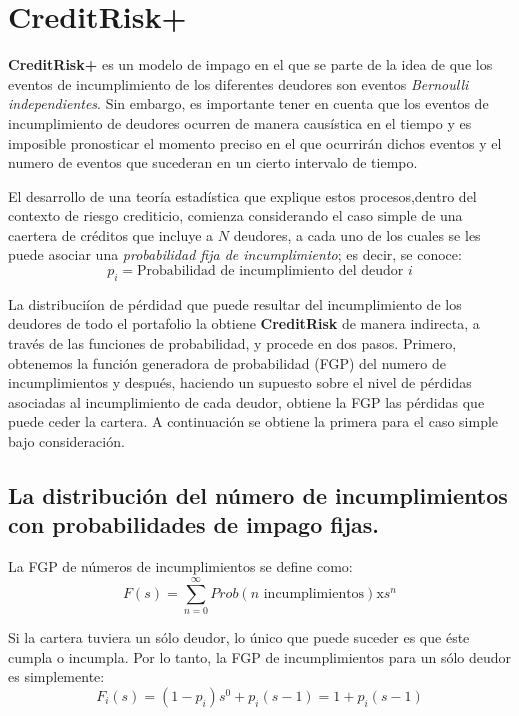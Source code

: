 \documentclass[
  12pt,
]{krantz}
\theoremstyle{definition}
\theoremstyle{definition}
\theoremstyle{definition}
\theoremstyle{remark}
\begin{document}
\mainmatter

\hypertarget{creditrisk}{%
\chapter{CreditRisk+}\label{creditrisk}}

\textbf{CreditRisk+} es un modelo de impago en el que se parte de la idea de que los eventos de incumplimiento de los diferentes deudores son eventos \emph{Bernoulli independientes}. Sin embargo, es importante tener en cuenta que los eventos de incumplimiento de deudores ocurren de manera causística en el tiempo y es imposible pronosticar el momento preciso en el que ocurrirán dichos eventos y el numero de eventos que sucederan en un cierto intervalo de tiempo.

El desarrollo de una teoría estadística que explique estos procesos,dentro del contexto de riesgo crediticio, comienza considerando el caso simple de una caertera de créditos que incluye a \(N\) deudores, a cada uno de los cuales se les puede asociar una \emph{probabilidad fija de incumplimiento}; es decir, se conoce: \[p_i=\textrm{Probabilidad de incumplimiento del deudor } i\]

La distribuciíon de pérdidad que puede resultar del incumplimiento de los deudores de todo el portafolio la obtiene \textbf{CreditRisk} de manera indirecta, a través de las funciones de probabilidad, y procede en dos pasos. Primero, obtenemos la función generadora de probabilidad (FGP) del numero de incumplimientos y después, haciendo un supuesto sobre el nivel de pérdidas asociadas al incumplimiento de cada deudor, obtiene la FGP las pérdidas que puede ceder la cartera. A continuación se obtiene la primera para el caso simple bajo consideración.

\hypertarget{la-distribucion-del-numero-de-incumplimientos-con-probabilidades-de-impago-fijas.}{%
\section{La distribución del número de incumplimientos con probabilidades de impago fijas.}\label{la-distribucion-del-numero-de-incumplimientos-con-probabilidades-de-impago-fijas.}}

La FGP de números de incumplimientos se define como: \[F(s)=\sum_{n=0}^{\infty}Prob(n \textrm{ incumplimientos})\textrm{x}s^n\]

Si la cartera tuviera un sólo deudor, lo único que puede suceder es que éste cumpla o incumpla. Por lo tanto, la FGP de incumplimientos para un sólo deudor es simplemente:\[F_i(s)=(1-p_i)s^0+p_i(s-1)=1+p_i(s-1)\]
\end{document}
